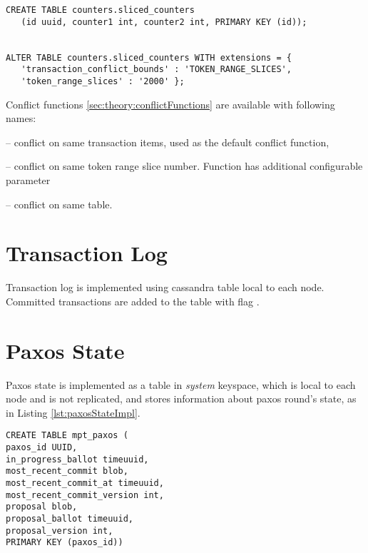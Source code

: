 \begin{lstlisting}[style=outcode,label={lst:configureConflictFunctions},caption={Configuring conflict function on Cassandra table}]
CREATE TABLE counters.sliced_counters 
   (id uuid, counter1 int, counter2 int, PRIMARY KEY (id));


ALTER TABLE counters.sliced_counters WITH extensions = { 
   'transaction_conflict_bounds' : 'TOKEN_RANGE_SLICES', 
   'token_range_slices' : '2000' };
\end{lstlisting}


Conflict functions \ref{sec:theory:conflictFunctions} are available with following names:
\begin{enumerate*}
\item {} -- conflict on same transaction items, used as the default conflict function,
\item {} -- conflict on same token range slice number. Function has additional configurable parameter 
\item {} -- conflict on same table.
\end{enumerate*}

\section{Transaction Log}
Transaction log is implemented using cassandra table local to each node. 
Committed transactions are added to the table with flag . 


\section{Paxos State}
Paxos state is implemented as a table in \emph{system} keyspace, which is local to each node and is not replicated, and stores information about paxos round's state, as in Listing \ref{lst:paxosStateImpl}.

\begin{lstlisting}[style=outcode,label={lst:paxosStateImpl},caption={Table definition for multi partition transactions paxos state}]
CREATE TABLE mpt_paxos (
paxos_id UUID,
in_progress_ballot timeuuid,
most_recent_commit blob,
most_recent_commit_at timeuuid,
most_recent_commit_version int,
proposal blob,
proposal_ballot timeuuid,
proposal_version int,
PRIMARY KEY (paxos_id))
\end{lstlisting}


